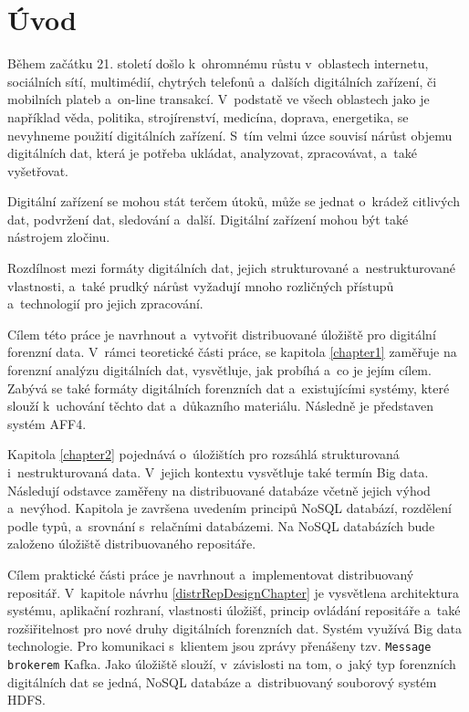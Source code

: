 

\chapter{Úvod}
Během začátku 21. století došlo k~ohromnému růstu v~oblastech internetu, sociálních sítí, multimédií, chytrých telefonů a~dalších digitálních zařízení, či mobilních plateb a~on-line transakcí. V~podstatě ve všech oblastech jako je například věda, politika, strojírenství, medicína, doprava, energetika, se nevyhneme použití digitálních zařízení. S~tím velmi úzce souvisí nárůst objemu digitálních dat, která je potřeba ukládat, analyzovat, zpracovávat, a~také vyšetřovat.

Digitální zařízení se mohou stát terčem útoků, může se jednat o~krádež citlivých dat, podvržení dat, sledování a~další. Digitální zařízení mohou být také nástrojem zločinu.

Rozdílnost mezi formáty digitálních dat, jejich strukturované a~nestrukturované vlastnosti, a~také prudký nárůst vyžadují mnoho rozličných přístupů a~technologií pro jejich zpracování.

Cílem této práce je navrhnout a~vytvořit distribuované úložiště pro digitální forenzní data. V~rámci teoretické části práce, se kapitola \ref{chapter1} zaměřuje na forenzní analýzu digitálních dat, vysvětluje, jak probíhá a~co je jejím cílem. Zabývá se také formáty digitálních forenzních dat a~existujícími systémy, které slouží k~uchování těchto dat a~důkazního materiálu. Následně je představen systém AFF4.

Kapitola \ref{chapter2} pojednává o~úložištích pro rozsáhlá strukturovaná i~nestrukturovaná data. V~jejich kontextu vysvětluje také termín Big data. Následují odstavce zaměřeny na distribuované databáze včetně jejich výhod a~nevýhod. Kapitola je završena uvedením principů NoSQL databází, rozdělení podle typů, a~srovnání s~relačními databázemi. Na NoSQL databázích bude založeno úložiště distribuovaného repositáře.

Cílem praktické části práce je navrhnout a~implementovat distribuovaný repositář. V~kapitole návrhu \ref{distrRepDesignChapter} je vysvětlena architektura systému, aplikační rozhraní, vlastnosti úložišť, princip ovládání repositáře a~také rozšiřitelnost pro nové druhy digitálních forenzních dat. Systém využívá Big data technologie. Pro komunikaci s~klientem jsou zprávy přenášeny tzv. \texttt{Message brokerem} Kafka. Jako úložiště slouží, v~závislosti na tom, o~jaký typ forenzních digitálních dat se jedná, NoSQL databáze a~distribuovaný souborový systém HDFS.


